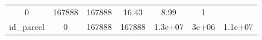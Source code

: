 \documentclass[]{book}
\theoremstyle{definition}
\theoremstyle{definition}
\theoremstyle{definition}
\theoremstyle{remark}
\begin{document}
\begin{longtable}[]{@{}ccccccc@{}}
\begin{minipage}[t]{0.11\columnwidth}
0\strut
\end{minipage} & \begin{minipage}[t]{0.12\columnwidth}\centering\strut
167888\strut
\end{minipage} & \begin{minipage}[t]{0.10\columnwidth}\centering\strut
167888\strut
\end{minipage} & \begin{minipage}[t]{0.11\columnwidth}\centering\strut
16.43\strut
\end{minipage} & \begin{minipage}[t]{0.09\columnwidth}\centering\strut
8.99\strut
\end{minipage} & \begin{minipage}[t]{0.10\columnwidth}\centering\strut
1\strut
\end{minipage}\tabularnewline
\begin{minipage}[t]{0.17\columnwidth}\centering\strut
id\_parcel\strut
\end{minipage} & \begin{minipage}[t]{0.11\columnwidth}\centering\strut
0\strut
\end{minipage} & \begin{minipage}[t]{0.12\columnwidth}\centering\strut
167888\strut
\end{minipage} & \begin{minipage}[t]{0.10\columnwidth}\centering\strut
167888\strut
\end{minipage} & \begin{minipage}[t]{0.11\columnwidth}\centering\strut
1.3e+07\strut
\end{minipage} & \begin{minipage}[t]{0.09\columnwidth}\centering\strut
3e+06\strut
\end{minipage} & \begin{minipage}[t]{0.10\columnwidth}\centering\strut
1.1e+07\strut
\end{minipage}\tabularnewline
\bottomrule
\end{longtable}
\end{document}
